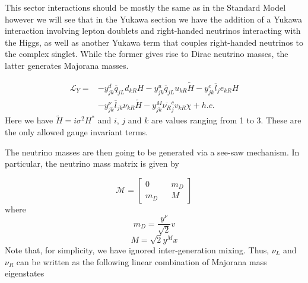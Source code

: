 \documentclass[12pt]{article}
\begin{document}
This sector interactions should be mostly the same as in the Standard Model however we will see that in the Yukawa section we have the addition of a Yukawa interaction involving lepton doublets and right-handed neutrinos interacting with the Higgs, as well as another Yukawa term that couples right-handed neutrinos to the complex singlet. While the former gives rise to Dirac neutrino masses, the latter generates Majorana masses.

\begin{align}
\mathcal{L}_Y= & -y^d_{jk}\overline{q}_{jL} d_{kR} H - y_{jk}^u \overline{q}_{jL} u_{kR} \tilde{H} - y^e_{jk} \overline{l}_j e_{kR} H \\ & -  y^\nu_{jk}\overline{l}_{jk} \nu_{kR} \tilde{H} - y^M_{jk}\overline{\nu_R}^c_j v_{kR} \chi + h.c.
\end{align}
Here we have $\tilde{H}=i\sigma^2 H^* $ and $i$, $j$ and $k$ are values ranging from 1 to 3.  These are the only allowed gauge invariant terms.

The neutrino masses are then going to be generated via a see-saw mechanism. In particular, the neutrino mass matrix is given by



\begin{equation}
\mathcal{M}=\begin{bmatrix}
0 && m_D \\
m_D && M 
\end{bmatrix}
\end{equation}
where  
\begin{equation}
m_D=\frac{y^\nu}{\sqrt{2}} v  
\end{equation}
\begin{equation}
M=\sqrt{2} y^M x  
\end{equation}
Note that, for simplicity, we have ignored inter-generation mixing. Thus, $\nu_L$ and $\nu_R$  can be written as the following linear combination of Majorana mass eigenstates 
\end{document}
